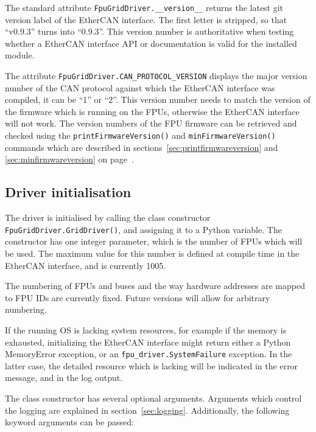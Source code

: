 \documentclass[11pt,a4paper]{report}
\begin{document}
The standard attribute \texttt{FpuGridDriver.\_\_version\_\_} returns
the latest git version label of the EtherCAN interface. The first letter is stripped, so
that ``v0.9.3'' turns into ``0.9.3''. This version number is
authoritative when testing whether a EtherCAN interface API or documentation is
valid for the installed module.

The attribute \texttt{FpuGridDriver.CAN\_PROTOCOL\_VERSION} displays
the major version number of the CAN protocol against which the EtherCAN interface
was compiled, it can be ``1'' or ``2''. This version number needs to
match the version of the firmware which is running on the FPUs,
otherwise the EtherCAN interface will not work. The version numbers of the FPU
firmware can be retrieved and checked using the
\texttt{printFirmwareVersion()} and \texttt{minFirmwareVersion()}
commands which are described in
sections~\ref{sec:printfirmwareversion} and
\ref{sec:minfirmwareversion} on
page~\pageref{sec:printfirmwareversion}.


\subsection{Driver initialisation}
\label{sec:driverinitialisation}
The driver is initialised by calling the class constructor
\texttt{FpuGridDriver.GridDriver()}, and assigning it to a Python
variable. The constructor has one integer parameter, which is the
number of FPUs which will be used. The maximum value for this number
is defined at compile time in the EtherCAN interface, and is currently 1005.

The numbering of FPUs and buses and the way hardware addresses are
mapped to FPU IDs are currently fixed. Future versions will allow for
arbitrary numbering.

\begin{sloppypar}
If the running OS is lacking system resources, for example if the
memory is exhausted, initializing the EtherCAN interface might return either a
Python MemoryError exception, or an
\texttt{fpu\_driver.SystemFailure} exception. In the latter case,
the detailed resource which is lacking will be indicated in the error
message, and in the log output.
\end{sloppypar}

\label{sec:driverparams}
The class constructor has several optional arguments. Arguments which
control the logging are explained in section~\ref{sec:logging}.
Additionally, the following keyword arguments can
be passed:
\end{document}
